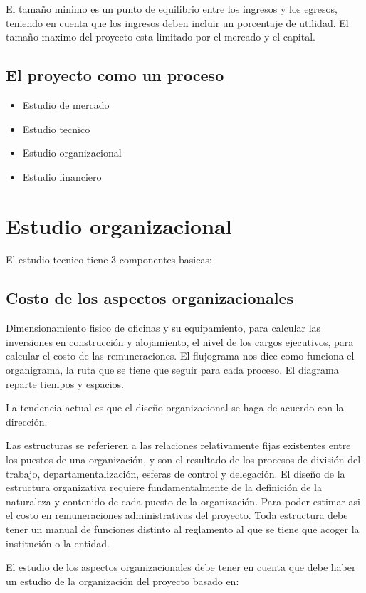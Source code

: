 \documentclass[a4paper, 11pt, oneside]{article}
\begin{document}
El tamaño minimo es un punto de equilibrio entre los ingresos y los egresos, teniendo en cuenta que los ingresos deben incluir un 
porcentaje de utilidad. El tamaño maximo del proyecto esta limitado por el mercado y el capital.

\subsection{El proyecto como un proceso}

\begin{itemize}
	\item Estudio de mercado
	\item Estudio tecnico
	\item Estudio organizacional
	\item Estudio financiero
\end{itemize}

\section{Estudio organizacional}
El estudio tecnico tiene 3 componentes basicas:


\subsection{Costo de los aspectos organizacionales}
Dimensionamiento fisico de oficinas y su equipamiento, para calcular las inversiones en construcción y alojamiento, el nivel de los
cargos ejecutivos, para calcular el costo de las remuneraciones. El flujograma nos dice como funciona el organigrama, la ruta que se
tiene que seguir para cada proceso. El diagrama reparte tiempos y espacios.

La tendencia actual es que el diseño organizacional se haga de acuerdo con la dirección.

Las estructuras se referieren a las relaciones relativamente fijas existentes entre los puestos de una organización, y son el resultado
de los procesos de división del trabajo, departamentalización, esferas de control y delegación. El diseño de la estructura organizativa
requiere fundamentalmente de la definición de la naturaleza y contenido de cada puesto de la organización. Para poder estimar asi el
costo en remuneraciones administrativas del proyecto. Toda estructura debe tener un manual de funciones distinto al reglamento al que
se tiene que acoger la institución o la entidad.

El estudio de los aspectos organizacionales debe tener en cuenta que debe haber un estudio de la organización del proyecto basado en:
\end{document}
